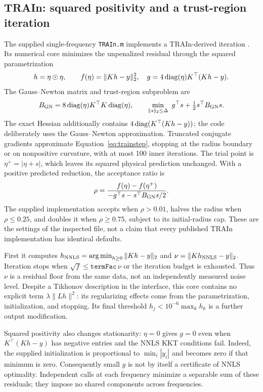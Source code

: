 \subsection{TRAIn: squared positivity and a trust-region iteration}\label{sec:trainmath}
The supplied single-frequency \texttt{TRAIn.m} implements a TRAIn-derived iteration \cite{train}. Its numerical core minimizes the unpenalized residual through the squared parametrization
\begin{equation}\label{eq:trainobjective}
 h=\eta\odot\eta,\qquad f(\eta)=\|Kh-y\|_2^2,
 \quad g=4\operatorname{diag}(\eta)K^\top(Kh-y).
\end{equation}
The Gauss--Newton matrix and trust-region subproblem are
\begin{equation}\label{eq:trainstep}
 B_{\rm GN}=8\operatorname{diag}(\eta)K^\top K\operatorname{diag}(\eta),\qquad
 \min_{\|s\|_2\leq\Delta}\ g^\top s+\tfrac12s^\top B_{\rm GN}s.
\end{equation}
The exact Hessian additionally contains $4\operatorname{diag}(K^\top(Kh-y))$; the code deliberately uses the Gauss--Newton approximation. Truncated conjugate gradients approximate Equation~\eqref{eq:trainstep}, stopping at the radius boundary or on nonpositive curvature, with at most 100 inner iterations. The trial point is $\eta^+=|\eta+s|$, which leaves its squared physical prediction unchanged. With a positive predicted reduction, the acceptance ratio is
\begin{equation}\label{eq:trainratio}
 \rho=\frac{f(\eta)-f(\eta^+)}{-g^\top s-s^\top B_{\rm GN}s/2}.
\end{equation}
The supplied implementation accepts when $\rho>0.01$, halves the radius when $\rho\leq0.25$, and doubles it when $\rho\geq0.75$, subject to its initial-radius cap. These are the settings of the inspected file, not a claim that every published TRAIn implementation has identical defaults.

First it computes $h_{\rm NNLS}=\operatorname*{arg\,min}_{h\geq0}\|Kh-y\|_2$ and $\nu=\|Kh_{\rm NNLS}-y\|_2$. Iteration stops when $\sqrt{f}\leq\mathtt{termFac}\,\nu$ or the iteration budget is exhausted. Thus $\nu$ is a residual floor from the same data, not an independently measured noise level. Despite a Tikhonov description in the interface, this core contains no explicit term $\lambda\|Lh\|^2$: its regularizing effects come from the parametrization, initialization, and stopping. Its final threshold $h_j<10^{-6}\max_kh_k$ is a further output modification.

Squared positivity also changes stationarity: $\eta=0$ gives $g=0$ even when $K^\top(Kh-y)$ has negative entries and the NNLS KKT conditions fail. Indeed, the supplied initialization is proportional to $\min_i|y_i|$ and becomes zero if that minimum is zero. Consequently small $g$ is not by itself a certificate of NNLS optimality. Independent calls at each frequency minimize a separable sum of these residuals; they impose no shared components across frequencies.

